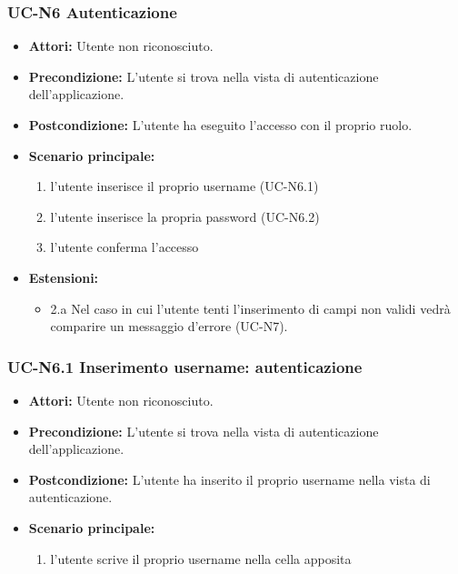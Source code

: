 \subsubsection{UC-N6 Autenticazione}
		\begin{itemize}
			\item \textbf{Attori:} Utente non riconosciuto.
			\item \textbf{Precondizione:} L'utente si trova nella vista di autenticazione dell'applicazione.
			\item \textbf{Postcondizione:} L'utente ha eseguito l'accesso con il proprio ruolo.
			\item \textbf{Scenario principale:}
				\begin{enumerate}
					\item l'utente inserisce il proprio username (UC-N6.1)
					\item l'utente inserisce la propria password (UC-N6.2)
					\item l'utente conferma l'accesso
				\end{enumerate}
				\item \textbf{Estensioni:}
				\begin{itemize}
					\item 2.a Nel caso in cui l'utente tenti l'inserimento di campi non validi vedrà comparire un messaggio d'errore (UC-N7).
				\end{itemize}
		\end{itemize}

\subsubsection{UC-N6.1 Inserimento username: autenticazione}
\begin{itemize}
	\item \textbf{Attori:} Utente non riconosciuto.
			\item \textbf{Precondizione:} L'utente si trova nella vista di autenticazione dell'applicazione.
			\item \textbf{Postcondizione:} L'utente ha inserito il proprio username nella vista di autenticazione.
			\item \textbf{Scenario principale:}
				\begin{enumerate}
					\item l'utente scrive il proprio username nella cella apposita
				\end{enumerate}
\end{itemize}

